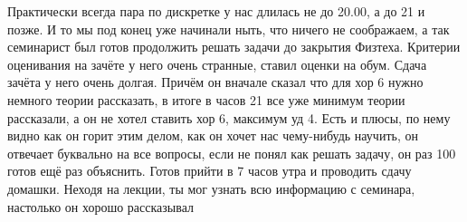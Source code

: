             \begin{commentbox} 
                Практически всегда пара по дискретке у нас длилась не до 20.00, а до 21 и позже. И то мы под конец уже начинали ныть, что ничего не соображаем, а так семинарист был готов продолжить решать задачи до закрытия Физтеха. Критерии оценивания на зачёте у него очень странные, ставил оценки на обум. Сдача зачёта у него очень долгая. Причём он вначале сказал что для хор 6 нужно немного теории рассказать, в итоге в часов 21 все уже минимум теории рассказали, а он не хотел ставить хор 6, максимум уд 4.  Есть и плюсы, по нему видно как он горит этим делом, как он хочет нас чему-нибудь научить, он отвечает буквально на все вопросы, если не понял как решать задачу, он раз 100 готов ещё раз объяснить. Готов прийти в 7 часов утра и проводить сдачу домашки. Неходя на лекции, ты мог узнать всю информацию с семинара, настолько он хорошо рассказывал 
            \end{commentbox}


